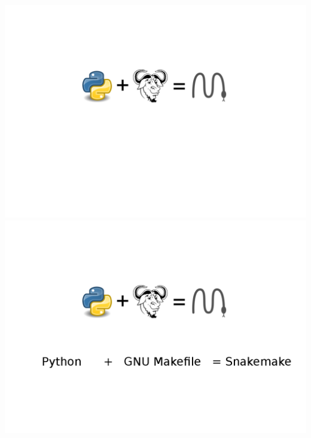 \documentclass{beamer}
\begin{document}
 

\begin{frame}[plain]
\centering
 \begin{overprint}
    \includegraphics[scale=0.3]{./images/equation2.png}
    \includegraphics[scale=0.3]{./images/equation1.png}
\end{overprint}
\end{frame}
\end{document}
